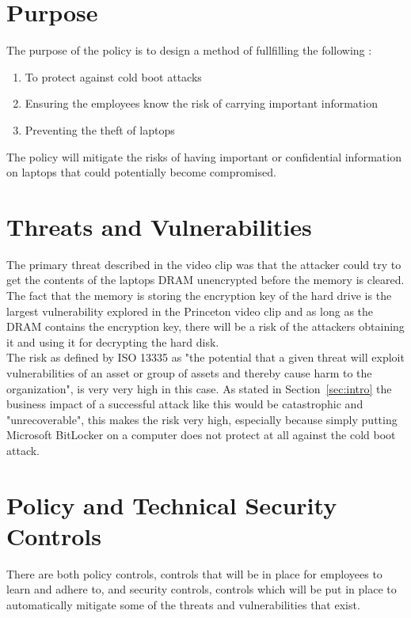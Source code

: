 \documentclass{article}
\numberwithin{equation}{section} %
\numberwithin{figure}{section} %
\numberwithin{table}{section} %
\begin{document}
\section{Purpose}
The purpose of the policy is to design a method of fullfilling the following : 
	\begin{enumerate}
		\item{To protect against cold boot attacks} 
		\item{Ensuring the employees know the risk of carrying important information}
		\item{Preventing the theft of laptops}
	\end{enumerate}
The policy will mitigate the risks of having important or confidential information on laptops that could potentially become compromised.  

\section{Threats and Vulnerabilities}
The primary threat described in the video clip was that the attacker could try to get the contents of the laptops DRAM unencrypted before the memory is cleared.  The fact that the memory is storing the encryption key of the hard drive is the largest vulnerability explored in the Princeton video clip and as long as the DRAM contains the encryption key, there will be a risk of the attackers obtaining it and using it for decrypting the hard disk.\\

The risk as defined by ISO 13335 as "the potential that a given threat will exploit vulnerabilities of an asset or group of assets and thereby cause harm to the organization", is very very high in this case.  As stated in Section~\ref{sec:intro} the business impact of a successful attack like this would be catastrophic and "unrecoverable", this makes the risk very high, especially because simply putting Microsoft BitLocker on a computer does not protect at all against the cold boot attack. \\

\section{Policy and Technical Security Controls}
There are both policy controls, controls that will be in place for employees to learn and adhere to, and security controls, controls which will be put in place to automatically mitigate some of the threats and vulnerabilities that exist.\\
\end{document}
